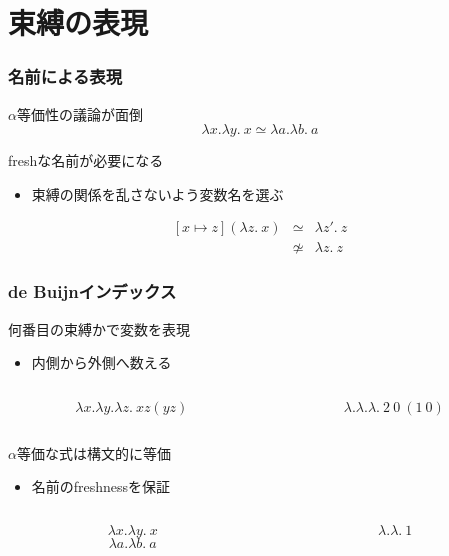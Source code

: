 \documentclass[dvipdfmx,cjk,xcolor=dvipsnames,envcountsect,notheorems,12pt]{beamer}
\theoremstyle{definition}
\begin{document}
\section{束縛の表現}

\begin{frame}
	\frametitle{名前による表現}
	\LARGE $\alpha$等価性の議論が面倒
	\[ \lambda x.\lambda y.~x \simeq \lambda a.\lambda b.~a \]

	\vfill

	freshな名前が必要になる
	\begin{itemize}
		\item 束縛の関係を乱さないよう変数名を選ぶ
	\end{itemize}
	\[
		\begin{array}{lcl}
			[x \mapsto z](\lambda z.~x) & \simeq & \lambda z'.~z \\
																	& \not \simeq & \lambda z.~z
		\end{array}
	\]
\end{frame}

\begin{frame}
	\frametitle{de Buijnインデックス}
	\LARGE
	何番目の束縛かで変数を表現
	\begin{itemize}
		\item 内側から外側へ数える
	\end{itemize}
	\begin{columns}
		\begin{column}{0.5\textwidth}
			\[ \lambda x. \lambda y. \lambda z.~x z (y z) \]
		\end{column}
		\begin{column}{0.5\textwidth}
			\[ \lambda. \lambda. \lambda.~2~0~(1~0) \]
		\end{column}
	\end{columns}

	\vfill

	$\alpha$等価な式は構文的に等価
	\begin{itemize}
		\item 名前のfreshnessを保証
	\end{itemize}
	\begin{columns}
		\begin{column}{0.5\textwidth}
			\[ \lambda x.\lambda y.~x \]
			\[ \lambda a.\lambda b.~a \]
		\end{column}
		\begin{column}{0.5\textwidth}
			\[ \lambda.\lambda.~1 \]
		\end{column}
	\end{columns}
\end{frame}
\end{document}
